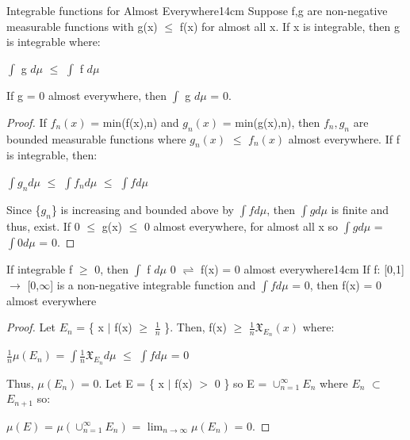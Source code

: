     \begin{wtheorem}{Integrable functions for Almost Everywhere}{14cm}
        Suppose f,g are non-negative measurable functions with g(x) $\leq$ f(x)
        for almost all x. If x is integrable, then g is integrable where:

        \hspace{0.5cm}
        $\int$ g $d\mu$
        $\leq$ $\int$ f $d\mu$

        If g = 0 almost everywhere, then $\int$ g $d\mu$ = 0.
    \end{wtheorem}

    \begin{proof}
        If $f_n(x)$ = min(f(x),n) and $g_n(x)$ = min(g(x),n),
        then $f_n,g_n$ are bounded measurable functions
        where $g_n(x)$ $\leq$ $f_n(x)$ almost everywhere.
        If f is integrable, then:

        \hspace{0.5cm}
        $\int g_n d\mu$
        $\leq$ $\int f_n d\mu$
        $\leq$ $\int f d\mu$

        Since \{$g_n$\} is increasing and bounded above by $\int f d\mu$,
        then $\int g d\mu$ is finite and thus, exist.
        If 0 $\leq$ g(x) $\leq$ 0 almost everywhere,
        for almost all x so $\int g d\mu$ = $\int 0 d\mu$ = 0.
    \end{proof}

    \newpage



    \begin{corollary}{If integrable f $\geq$ 0, then
    $\int$ f $d\mu$ 0 $\rightleftharpoons$ f(x) = 0 almost everywhere}{14cm}
        If f: [0,1] $\rightarrow$ [0,$\infty$] is a non-negative integrable
        function and $\int f d\mu$ = 0, then f(x) = 0 almost everywhere
    \end{corollary}

    \begin{proof}
        Let $E_n$ = \{ x $|$ f(x) $\geq$ $\frac{1}{n}$ \}.
        Then, f(x) $\geq$ $\frac{1}{n} \mathfrak{X}_{E_n}(x)$ where:

        \hspace{0.5cm}
        $\frac{1}{n} \mu(E_n)$
        = $\int \frac{1}{n} \mathfrak{X}_{E_n} d\mu$
        $\leq$ $\int f d\mu$
        = 0

        Thus, $\mu(E_n)$ = 0.
        Let E = \{ x $|$ f(x) $>$ 0 \}
        so E = $\cup_{n=1}^{\infty} E_n$ where $E_n$ $\subset$ $E_{n+1}$ so:

        \hspace{0.5cm}
        $\mu(E)$
        = $\mu(\cup_{n=1}^{\infty} E_n)$
        = $\lim_{n \rightarrow \infty} \mu(E_n)$
        = 0.
    \end{proof}


